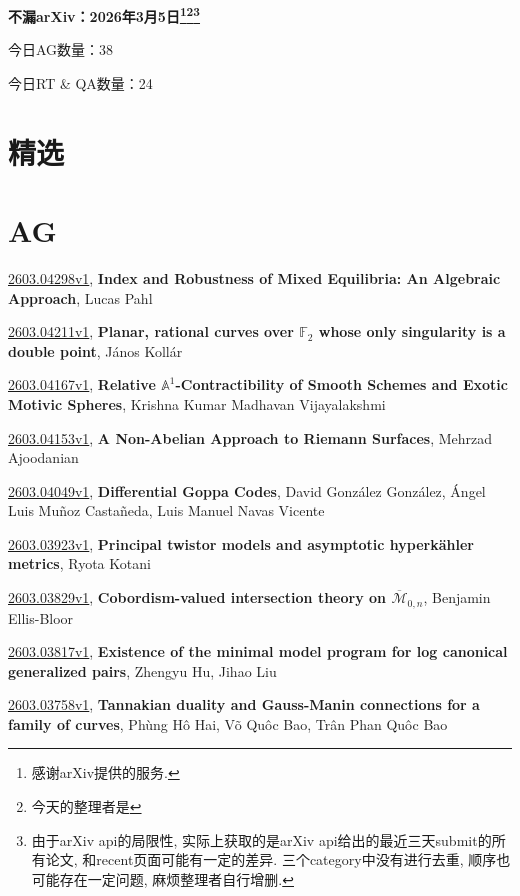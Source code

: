 \documentclass[9pt, a4paper]{article}
\theoremstyle{plain}
\theoremstyle{definition}
\theoremstyle{remark}
\newcommand{\arxiv}[3]{\href{https://arxiv.org/abs/#1}{#1}, \textbf{\textcolor{arxivblue}{#2}}, #3}
\newcommand{\AGnumber}{38}
\newcommand{\RTQAnumber}{24}
\newcommand{\NewestDate}{2026年3月5日}
\newcommand{\todayarXiver}{} %
\begin{document}
\begin{center}
    \Huge\textbf{不漏arXiv：\NewestDate\footnote{感谢arXiv提供的服务.}\footnote{今天的整理者是\todayarXiver}\footnote{由于arXiv api的局限性, 实际上获取的是arXiv api给出的最近三天submit的所有论文, 和recent页面可能有一定的差异. 三个category中没有进行去重, 顺序也可能存在一定问题, 麻烦整理者自行增删.}} \\
\end{center}

\setcounter{section}{-1}

\begin{center}
    今日AG数量：\AGnumber
    
    今日RT \& QA数量：\RTQAnumber
    
\end{center}


\section{精选}


\section{AG}
\arxiv{2603.04298v1}{Index and Robustness of Mixed Equilibria: An Algebraic Approach}{Lucas Pahl}

\arxiv{2603.04211v1}{Planar, rational curves over ${\mathbb F}_2$ whose only singularity is a double point}{János Kollár}

\arxiv{2603.04167v1}{Relative $\mathbb{A}^1$-Contractibility of Smooth Schemes and Exotic Motivic Spheres}{Krishna Kumar Madhavan Vijayalakshmi}

\arxiv{2603.04153v1}{A Non-Abelian Approach to Riemann Surfaces}{Mehrzad Ajoodanian}

\arxiv{2603.04049v1}{Differential Goppa Codes}{David González González, Ángel Luis Muñoz Castañeda, Luis Manuel Navas Vicente}

\arxiv{2603.03923v1}{Principal twistor models and asymptotic hyperkähler metrics}{Ryota Kotani}

\arxiv{2603.03829v1}{Cobordism-valued intersection theory on $\overline{\mathcal{M}}_{0,n}$}{Benjamin Ellis-Bloor}

\arxiv{2603.03817v1}{Existence of the minimal model program for log canonical generalized pairs}{Zhengyu Hu, Jihao Liu}

\arxiv{2603.03758v1}{Tannakian duality and Gauss-Manin connections for a family of curves}{Phùng Hô Hai, Võ Quôc Bao, Trân Phan Quôc Bao}
\end{document}
